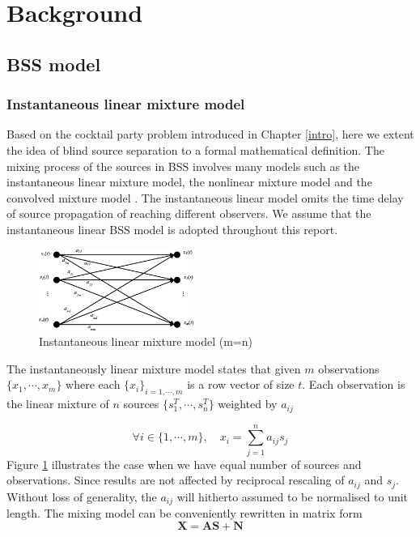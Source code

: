 \section{Background} \label{background}
\subsection{BSS model} 
\subsubsection{Instantaneous linear mixture model} \label{bssmodel}
Based on the cocktail party problem introduced in Chapter \ref{intro}, here we extent the idea of blind source separation to a formal mathematical definition. %
The mixing process of the sources in BSS involves many models such as the instantaneous linear mixture model, the nonlinear mixture model and the convolved mixture model \cite{Hxu2014}. The instantaneous linear model omits the time delay of source propagation of reaching different observers. We assume that the instantaneous linear BSS model is adopted throughout this report.\\

\begin{figure}[H]
\centering
\includegraphics[width=0.45\textwidth]{images/Instantaneous-linear-mixture-model.png}
\caption{Instantaneous linear mixture model (m=n)}
\label{Ins_LMM}
\end{figure}


The instantaneously linear mixture model states that given $m$ observations $\{x_1,\cdots, x_m\}$ where each $\{x_i\}_{i=1, \cdots,m}$ is a row vector of size $t$. Each observation is the linear mixture of $n$ sources $\{s_1^T,\cdots, s_n^T\}$ weighted by $a_{ij}$

\begin{equation}
    \forall i \in \{1, \cdots, m\}, \quad x_i = \sum_{j=1}^n a_{ij}s_j
    \label{sumofs_t}
\end{equation}
Figure \ref{Ins_LMM} illustrates the case when we have equal number of sources and observations. Since results are not affected by reciprocal rescaling of $a_{ij}$ and $s_j$. Without loss of generality, the $a_{ij}$ will hitherto assumed to be normalised to unit length. The mixing model can be conveniently rewritten in matrix form
\begin{equation}
    \mathbf{X} = \mathbf{AS} +\mathbf{N}   
    \label{mixing}
\end{equation}

